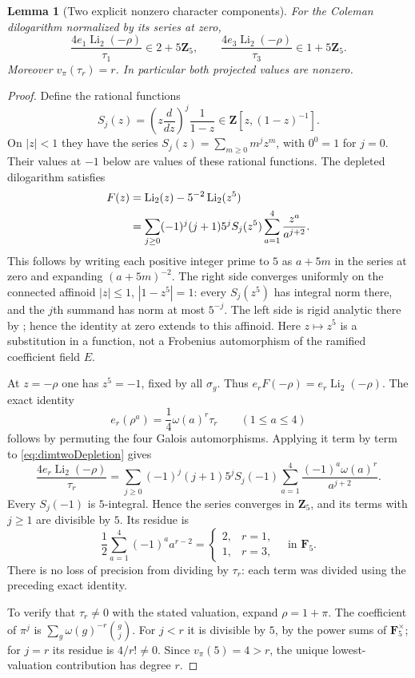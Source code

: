 \documentclass[11pt,a4paper]{article}
\newtheorem{lemma}[theorem]{Lemma}
\theoremstyle{remark}
\begin{document}
\begin{lemma}[Two explicit nonzero character components]
\label{lem:dimtwoDilogCharacters}
For the Coleman dilogarithm normalized by its series at zero,
\[
 \frac{4e_1\operatorname{Li}_2(-\rho)}{\tau_1}
       \in 2+5\mathbf Z_5,
 \qquad
 \frac{4e_3\operatorname{Li}_2(-\rho)}{\tau_3}
       \in 1+5\mathbf Z_5.
\]
Moreover $v_\pi(\tau_r)=r$.  In particular both projected values
are nonzero.
\end{lemma}

\begin{proof}
Define the rational functions
\[
 S_j(z)=\left(z\frac{d}{dz}\right)^j\frac1{1-z}
       \in\mathbf Z[z,(1-z)^{-1}].
\]
On $|z|<1$ they have the series
$S_j(z)=\sum_{m\ge0}m^jz^m$, with $0^0=1$ for $j=0$.
Their values at $-1$ below are values of these rational functions.
The depleted dilogarithm satisfies
\begin{align}
 F(z)&=\operatorname{Li}_2(z)-5^{-2}\operatorname{Li}_2(z^5)
 \label{eq:dimtwoDepletion}\\
 &=\sum_{j\ge0}(-1)^j(j+1)5^j S_j(z^5)
                  \sum_{a=1}^4\frac{z^a}{a^{j+2}}.\notag
\end{align}
This follows by writing each positive integer prime to $5$ as
$a+5m$ in the series at zero and expanding $(a+5m)^{-2}$.
The right side converges uniformly on the connected affinoid
$|z|\le1$, $|1-z^5|=1$: every $S_j(z^5)$ has integral norm
there, and the $j$th summand has norm at most $5^{-j}$.
The left side is rigid analytic there by
\cite[Theorem~2.7(3)]{BesserDeJeuAlgorithm}; hence the identity
at zero extends to this affinoid.  Here $z\mapsto z^5$ is a
substitution in a function, not a Frobenius automorphism of the
ramified coefficient field $E$.

At $z=-\rho$ one has $z^5=-1$, fixed by all $\sigma_g$.
Thus $e_rF(-\rho)=e_r\operatorname{Li}_2(-\rho)$.
The exact identity
\[
 e_r(\rho^a)=\frac14\omega(a)^r\tau_r\qquad(1\le a\le4)
\]
follows by permuting the four Galois automorphisms.  Applying it
term by term to \eqref{eq:dimtwoDepletion} gives
\[
 \frac{4e_r\operatorname{Li}_2(-\rho)}{\tau_r}
 =\sum_{j\ge0}(-1)^j(j+1)5^j S_j(-1)
       \sum_{a=1}^4\frac{(-1)^a\omega(a)^r}{a^{j+2}}.
\]
Every $S_j(-1)$ is $5$-integral.  Hence the series converges
in $\mathbf Z_5$, and its terms with $j\ge1$ are divisible by $5$.
Its residue is
\[
 \frac12\sum_{a=1}^4(-1)^a a^{r-2}
 =\begin{cases}2,&r=1,\\1,&r=3,\end{cases}
 \quad\text{in }\mathbf F_5.
\]
There is no loss of precision from dividing by $\tau_r$: each
term was divided using the preceding exact identity.

To verify that $\tau_r\ne0$ with the stated valuation, expand
$\rho=1+\pi$.  The coefficient of $\pi^j$ is
$\sum_g\omega(g)^{-r}\binom gj$.  For $j<r$ it is divisible by
$5$, by the power sums of $\mathbf F_5^\times$; for $j=r$ its
residue is $4/r!\ne0$.  Since $v_\pi(5)=4>r$, the unique
lowest-valuation contribution has degree $r$.
\end{proof}
\end{document}
